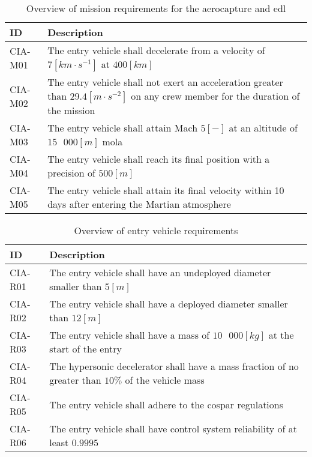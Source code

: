 \begin{table}[h]
	\caption[Overview of mission requirements for the aerocapture and \acrlong{edl}]{Overview of mission requirements for the aerocapture and \gls{edl}}
	\label{tab:misreq} 
	\begin{tabular}{|p{}|p{}|}
    \hline
    \textbf{ID}          & \textbf{Description}                                                                                                      \\ \hline \hline
    CIA-M01& The entry vehicle shall decelerate from a velocity of $7 \left[km\cdot s ^{-1}\right]$ at $400 \left[km\right]$  \\ \hline
    CIA-M02 & The entry vehicle shall not exert an acceleration greater than $29.4 \left[ m \cdot s^{-2}\right]$ on any crew member for the duration of the mission			\\ \hline
    	CIA-M03 & The entry vehicle shall attain Mach $5 \left[-\right]$ at an altitude of $15\mbox{ }000 \left[m\right]$  \gls{mola} \\ \hline
    	CIA-M04 & The entry vehicle shall reach its final position with a precision of $500 \left[m\right]$\\ \hline
    	CIA-M05 & The entry vehicle shall attain its final velocity within 10 days after entering the Martian atmosphere \\ \hline
    \end{tabular}
\end{table}

\begin{table}[h]
	\caption{Overview of entry vehicle requirements} 
	\label{tab:vehreq}
	\begin{tabular}{|p{}|p{}|}
		\hline
		\textbf{ID}          & \textbf{Description}                                                                                                     \\ \hline \hline
		CIA-R01 & The entry vehicle shall have an undeployed diameter smaller than $5 \left[m\right]$                         				            \\ \hline
		CIA-R02 & The entry vehicle shall have a deployed diameter smaller than $12 \left[m\right]$                         				            \\ \hline	
		CIA-R03 & The entry vehicle shall have a mass of $10\mbox{ }000 \left[kg\right]$ at the start of the entry                       				            \\ \hline
		CIA-R04 & The hypersonic decelerator shall have a mass fraction of no greater than $10\%$ of the vehicle mass  \\ \hline
		CIA-R05 &  The entry vehicle shall adhere to the \gls{cospar} regulations \\ \hline
		CIA-R06 &  The entry vehicle shall have control system reliability of at least $0.9995$  \\ \hline
	\end{tabular}
\end{table}